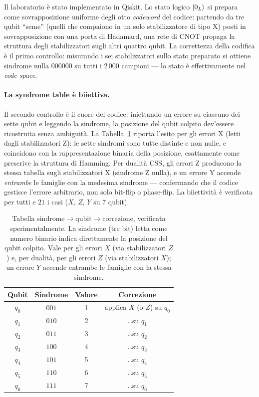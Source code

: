 \begin{onehalfspace}
Il laboratorio è stato implementato in Qiskit. Lo stato logico $\ket{0_L}$ si prepara come sovrapposizione uniforme degli otto \textit{codeword} del codice: partendo da tre qubit ``seme'' (quelli che compaiono in un solo stabilizzatore di tipo X) posti in sovrapposizione con una porta di Hadamard, una rete di \ac{CNOT} propaga la struttura degli stabilizzatori sugli altri quattro qubit. La correttezza della codifica è il primo controllo: misurando i sei stabilizzatori sullo stato preparato si ottiene sindrome nulla $000000$ su tutti i $2\,000$ campioni --- lo stato è effettivamente nel \textit{code space}.

\paragraph{La syndrome table è biiettiva.}
Il secondo controllo è il cuore del codice: iniettando un errore su ciascuno dei sette qubit e leggendo la sindrome, la posizione del qubit colpito dev'essere ricostruita senza ambiguità. La Tabella~\ref{tab:steane_sindrome} riporta l'esito per gli errori X (letti dagli stabilizzatori Z): le sette sindromi sono tutte distinte e non nulle, e coincidono con la rappresentazione binaria della posizione, esattamente come prescrive la struttura di Hamming. Per dualità \ac{CSS}, gli errori Z producono la stessa tabella sugli stabilizzatori X (sindrome Z nulla), e un errore Y accende \emph{entrambe} le famiglie con la medesima sindrome --- confermando che il codice gestisce l'errore arbitrario, non solo bit-flip o phase-flip. La biiettività è verificata per tutti e $21$ i casi ($X$, $Z$, $Y$ su $7$ qubit).

\begin{table}[H]
\centering
\begin{tabular}{cccc}
\toprule
\textbf{Qubit} & \textbf{Sindrome} & \textbf{Valore} & \textbf{Correzione} \\
\midrule
$q_0$ & $001$ & 1 & applica $X$ (o $Z$) su $q_0$ \\
$q_1$ & $010$ & 2 & \ldots su $q_1$ \\
$q_2$ & $011$ & 3 & \ldots su $q_2$ \\
$q_3$ & $100$ & 4 & \ldots su $q_3$ \\
$q_4$ & $101$ & 5 & \ldots su $q_4$ \\
$q_5$ & $110$ & 6 & \ldots su $q_5$ \\
$q_6$ & $111$ & 7 & \ldots su $q_6$ \\
\bottomrule
\end{tabular}
\caption[Syndrome table del codice di Steane]{Tabella sindrome$\rightarrow$qubit$\rightarrow$correzione, verificata sperimentalmente. La sindrome (tre bit) letta come numero binario indica direttamente la posizione del qubit colpito. Vale per gli errori $X$ (via stabilizzatori $Z$) e, per dualità, per gli errori $Z$ (via stabilizzatori $X$); un errore $Y$ accende entrambe le famiglie con la stessa sindrome.}
\label{tab:steane_sindrome}
\end{table}


\end{onehalfspace}
